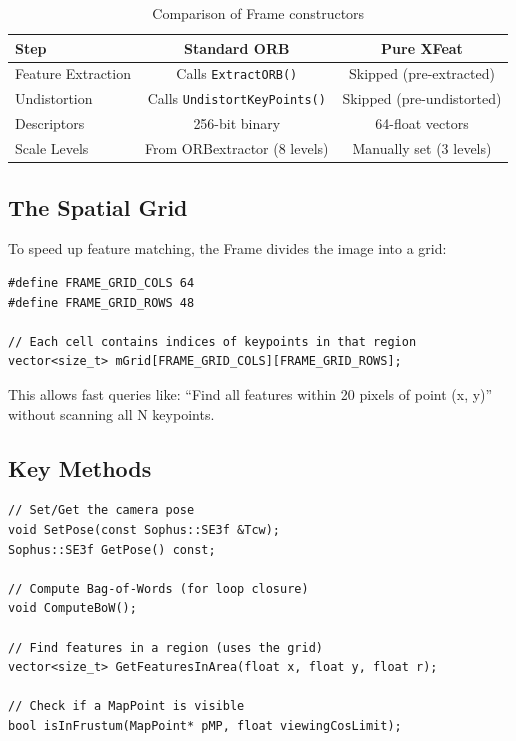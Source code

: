 \begin{table}[H]
\centering
\begin{tabular}{@{}lcc@{}}
\toprule
\textbf{Step} & \textbf{Standard ORB} & \textbf{Pure XFeat} \\
\midrule
Feature Extraction & Calls \texttt{ExtractORB()} & Skipped (pre-extracted) \\
Undistortion & Calls \texttt{UndistortKeyPoints()} & Skipped (pre-undistorted) \\
Descriptors & 256-bit binary & 64-float vectors \\
Scale Levels & From ORBextractor (8 levels) & Manually set (3 levels) \\
\bottomrule
\end{tabular}
\caption{Comparison of Frame constructors}
\end{table}

\subsection{The Spatial Grid}

To speed up feature matching, the Frame divides the image into a grid:

\begin{lstlisting}[caption={Spatial grid for fast lookup}]
#define FRAME_GRID_COLS 64
#define FRAME_GRID_ROWS 48

// Each cell contains indices of keypoints in that region
vector<size_t> mGrid[FRAME_GRID_COLS][FRAME_GRID_ROWS];
\end{lstlisting}

This allows fast queries like: ``Find all features within 20 pixels of point (x, y)'' without scanning all N keypoints.

\subsection{Key Methods}

\begin{lstlisting}[caption={Important Frame methods}]
// Set/Get the camera pose
void SetPose(const Sophus::SE3f &Tcw);
Sophus::SE3f GetPose() const;

// Compute Bag-of-Words (for loop closure)
void ComputeBoW();

// Find features in a region (uses the grid)
vector<size_t> GetFeaturesInArea(float x, float y, float r);

// Check if a MapPoint is visible
bool isInFrustum(MapPoint* pMP, float viewingCosLimit);
\end{lstlisting}

